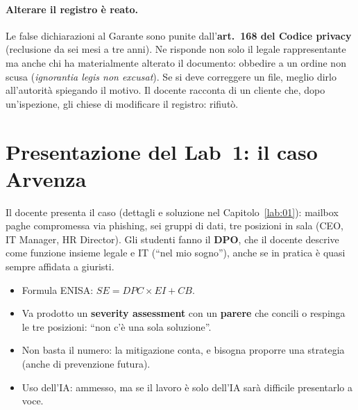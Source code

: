 \paragraph{Alterare il registro è reato.} Le false dichiarazioni al Garante sono punite
dall'\textbf{art.~168 del Codice privacy} (reclusione da sei mesi a tre anni). Ne risponde non solo
il legale rappresentante ma anche chi ha materialmente alterato il documento: obbedire a un ordine
non scusa (\emph{ignorantia legis non excusat}). Se si deve correggere un file, meglio dirlo
all'autorità spiegando il motivo. Il docente racconta di un cliente che, dopo un'ispezione, gli
chiese di modificare il registro: rifiutò.

\section{Presentazione del Lab~1: il caso Arvenza}
Il docente presenta il caso (dettagli e soluzione nel Capitolo~\ref{lab:01}): mailbox paghe
compromessa via phishing, sei gruppi di dati, tre posizioni in sala (CEO, IT Manager, HR Director).
Gli studenti fanno il \textbf{DPO}, che il docente descrive come funzione insieme legale e IT
(``nel mio sogno''), anche se in pratica è quasi sempre affidata a giuristi.
\begin{itemize}
  \item Formula ENISA: $SE = DPC \times EI + CB$.
  \item Va prodotto un \textbf{severity assessment} con un \textbf{parere} che concili o respinga le
    tre posizioni: ``non c'è una sola soluzione''.
  \item Non basta il numero: la mitigazione conta, e bisogna proporre una strategia (anche di
    prevenzione futura).
  \item Uso dell'IA: ammesso, ma se il lavoro è solo dell'IA sarà difficile presentarlo a voce.
\end{itemize}

